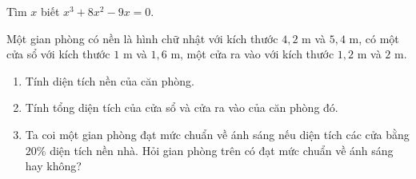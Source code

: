 \begin{bt}%
	Tìm $ x $ biết $ x^{3}+8x^{2}-9x=0 $.
	\loigiai{
Ta có
\begin{eqnarray*}
	x^{3}+8x^{2}-9x=0&\Leftrightarrow& x(x^{2}+8x-9)=0\\
	&\Leftrightarrow& x(x^{2}-1+8x-8)=0\\
	&\Leftrightarrow& x(x-1)(x+8)=0\\
	&\Leftrightarrow& \left[\begin{aligned}
&x=0\\ &x=1\\ &x=-8.
\end{aligned}\right.
\end{eqnarray*}	
}
\end{bt}
\begin{bt}%
	Một gian phòng có nền là hình chữ nhật với kích thước $ 4,2 $ m và $ 5,4 $ m, có một cửa sổ với kích thước $ 1 $ m và $ 1,6 $ m, một cửa ra vào với kích thước $ 1,2 $ m và $ 2 $ m.
	\begin{enumerate}
		\item Tính diện tích nền của căn phòng.
		\item Tính tổng diện tích của cửa sổ và cửa ra vào của căn phòng đó.
		\item Ta coi một gian phòng đạt mức chuẩn về ánh sáng nếu diện tích các cửa bằng $ 20\% $ diện tích nền nhà. Hỏi gian phòng trên có đạt mức chuẩn về ánh sáng hay không?
	\end{enumerate}
\end{bt}
